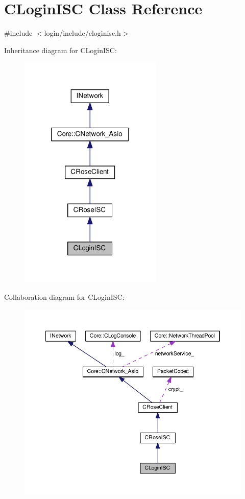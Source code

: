 \hypertarget{classCLoginISC}{}\section{C\+Login\+I\+SC Class Reference}
\label{classCLoginISC}


{\ttfamily \#include $<$login/include/cloginisc.\+h$>$}



Inheritance diagram for C\+Login\+I\+SC\+:
\nopagebreak
\begin{figure}[H]
\begin{center}
\leavevmode
\includegraphics[width=193pt]{classCLoginISC__inherit__graph}
\end{center}
\end{figure}


Collaboration diagram for C\+Login\+I\+SC\+:
\nopagebreak
\begin{figure}[H]
\begin{center}
\leavevmode
\includegraphics[width=350pt]{classCLoginISC__coll__graph}
\end{center}
\end{figure}
